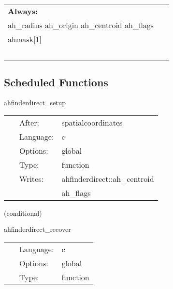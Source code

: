  \begin{tabular*}{160mm}{ll} 

{\bf Always:}&  ~ \\ 
 ah\_radius ah\_origin ah\_centroid ah\_flags & ~\\ 
 ahmask[1] & ~\\ 
~ & ~\\ 
\end{tabular*} 


\subsection*{Scheduled Functions}
\vspace{5mm}


\hspace{5mm} ahfinderdirect\_setup 

\hspace{5mm}{\it setup data structures } 


\hspace{5mm}

 \begin{tabular*}{160mm}{cll} 
~ & After:  & spatialcoordinates \\ 
~ & Language:  & c \\ 
~ & Options:  & global \\ 
~ & Type:  & function \\ 
~ & Writes:  & ahfinderdirect::ah\_centroid \\ 
~& ~ &ah\_flags\\ 
\end{tabular*} 


\vspace{5mm}

   (conditional) 

\hspace{5mm} ahfinderdirect\_recover 

\hspace{5mm}{\it import horizon data from cactus variables } 


\hspace{5mm}

 \begin{tabular*}{160mm}{cll} 
~ & Language:  & c \\ 
~ & Options:  & global \\ 
~ & Type:  & function \\ 
\end{tabular*} 


